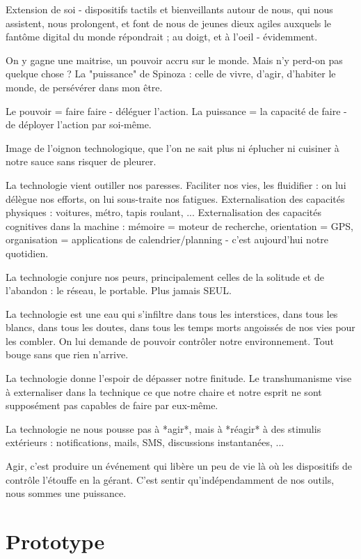Extension de soi - dispositifs tactils et bienveillants autour de nous, qui nous assistent,
nous prolongent, et font de nous de jeunes dieux agiles auxquels le fantôme digital du monde répondrait
; au doigt, et à l'oeil - évidemment.

On y gagne une maitrise, un pouvoir accru sur le monde. Mais n'y perd-on pas quelque chose ?
La "puissance" de Spinoza : celle de vivre, d'agir, d'habiter le monde, de persévérer dans mon être.

Le pouvoir = faire faire - déléguer l'action.
La puissance = la capacité de faire - de déployer l'action par soi-même.

Image de l'oignon technologique, que l'on ne sait plus ni éplucher ni cuisiner à notre
sauce sans risquer de pleurer.

La technologie vient outiller nos paresses. Faciliter nos vies, les fluidifier : on lui
délègue nos efforts, on lui sous-traite nos fatigues. Externalisation des capacités physiques :
voitures, métro, tapis roulant, ... Externalisation des capacités cognitives dans la machine :
mémoire = moteur de recherche, orientation = GPS, organisation = applications de
calendrier/planning - c'est aujourd'hui notre quotidien.

La technologie conjure nos peurs, principalement celles de la solitude et de l'abandon :
le réseau, le portable. Plus jamais SEUL.

La technologie est une eau qui s'infiltre dans tous les interstices, dans tous les blancs,
dans tous les doutes, dans tous les temps morts angoissés de nos vies pour les combler.
On lui demande de pouvoir contrôler notre environnement. Tout bouge sans que rien n'arrive. 

La technologie donne l'espoir de dépasser notre finitude. Le transhumanisme vise à
externaliser dans la technique ce que notre chaire et notre esprit ne sont supposément
pas capables de faire par eux-même.

La technologie ne nous pousse pas à *agir*, mais à *réagir* à des stimulis extérieurs :
notifications, mails, SMS, discussions instantanées, ...

Agir, c'est produire un événement qui libère un peu de vie là où les dispositifs de contrôle
l'étouffe en la gérant. C'est sentir qu'indépendamment de nos outils, nous sommes une puissance.


\section*{Prototype}


